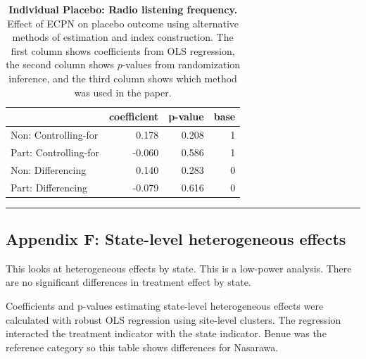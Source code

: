 \documentclass[
]{article}
\begin{document}
\begin{table}[H]
\begin{center}
\label{tab:pl_rad_ind}
\caption{\textbf{Individual Placebo: Radio listening frequency.} Effect of ECPN on placebo outcome using alternative methods of estimation and index construction. The first column shows coefficients from OLS regression, the second column shows $p$-values from randomization inference, and the third column shows which method was used in the paper.}
\smallskip

\begin{tabular}{l|r|r|r}
\hline
  & coefficient & p-value & base\\
\hline
Non: Controlling-for & 0.178 & 0.208 & 1\\
\hline
Part: Controlling-for & -0.060 & 0.586 & 1\\
\hline
Non: Differencing & 0.140 & 0.283 & 0\\
\hline
Part: Differencing & -0.079 & 0.616 & 0\\
\hline
\end{tabular}


\end{center}
\end{table}

\begin{center}\rule{0.5\linewidth}{0.5pt}\end{center}

\hypertarget{appendix-f-state-level-heterogeneous-effects}{%
\subsection{Appendix F: State-level heterogeneous
effects}\label{appendix-f-state-level-heterogeneous-effects}}

This looks at heterogeneous effects by state. This is a low-power
analysis. There are no significant differences in treatment effect by
state.

Coefficients and p-values estimating state-level heterogeneous effects
were calculated with robust OLS regression using site-level clusters.
The regression interacted the treatment indicator with the state
indicator. Benue was the reference category so this table shows
differences for Nasarawa.
\end{document}
